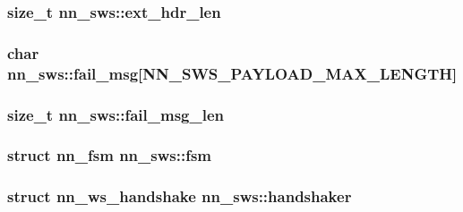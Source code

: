 \subsubsection[{ext\+\_\+hdr\+\_\+len}]{\setlength{\rightskip}{0pt plus 5cm}size\+\_\+t nn\+\_\+sws\+::ext\+\_\+hdr\+\_\+len}\hypertarget{structnn__sws_ae899440bdfb42d398c22837861363f56}{}\label{structnn__sws_ae899440bdfb42d398c22837861363f56}
\subsubsection[{fail\+\_\+msg}]{\setlength{\rightskip}{0pt plus 5cm}char nn\+\_\+sws\+::fail\+\_\+msg\mbox{[}{\bf N\+N\+\_\+\+S\+W\+S\+\_\+\+P\+A\+Y\+L\+O\+A\+D\+\_\+\+M\+A\+X\+\_\+\+L\+E\+N\+G\+TH}\mbox{]}}\hypertarget{structnn__sws_a9d03e1694e61fd9b31098e445fcf9fd1}{}\label{structnn__sws_a9d03e1694e61fd9b31098e445fcf9fd1}
\subsubsection[{fail\+\_\+msg\+\_\+len}]{\setlength{\rightskip}{0pt plus 5cm}size\+\_\+t nn\+\_\+sws\+::fail\+\_\+msg\+\_\+len}\hypertarget{structnn__sws_abeb867a90a0a86a267ad8098f80a2328}{}\label{structnn__sws_abeb867a90a0a86a267ad8098f80a2328}
\subsubsection[{fsm}]{\setlength{\rightskip}{0pt plus 5cm}struct {\bf nn\+\_\+fsm} nn\+\_\+sws\+::fsm}\hypertarget{structnn__sws_ae9c5bfd9cd2fda9942c5e25c6826ed3c}{}\label{structnn__sws_ae9c5bfd9cd2fda9942c5e25c6826ed3c}
\subsubsection[{handshaker}]{\setlength{\rightskip}{0pt plus 5cm}struct {\bf nn\+\_\+ws\+\_\+handshake} nn\+\_\+sws\+::handshaker}\hypertarget{structnn__sws_a4060b8ee8880773dbfd7b3157695f258}{}\label{structnn__sws_a4060b8ee8880773dbfd7b3157695f258}
